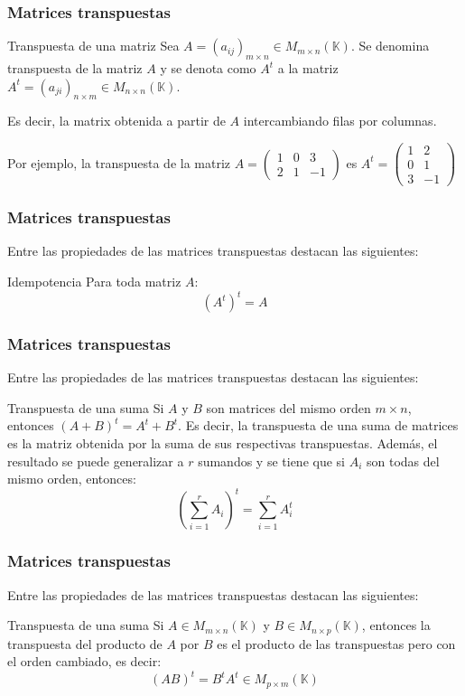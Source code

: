 \documentclass[aspectratio=169]{beamer}
\begin{document}
\begin{frame}
  \frametitle{Matrices transpuestas}
  
   \begin{block}{Transpuesta de una matriz}
Sea $A = (a_{ij})_{m\times n}\in M_{m\times n} (\mathbb{K})$. Se denomina transpuesta de la matriz $A$ y se denota como $A^t$ a la matriz $A^t = (a_{ji})_{n\times m}\in M_{n\times n}(\mathbb{K})$. 

Es decir, la matrix obtenida a partir de $A$ intercambiando filas por columnas. 
\end{block}

Por ejemplo, la transpuesta de la matriz $A =  \left(\begin{array}{ccc}1&0 & 3\\ 2&1 & -1\end{array}\right)$ es $A^t =  \left(\begin{array}{cc}1 & 2\\ 0 & 1\\3 &-1\end{array}\right)$
 \end{frame} 
 
 \begin{frame}
  \frametitle{Matrices transpuestas}
  Entre las propiedades de las matrices transpuestas destacan las siguientes:
   \begin{block}{Idempotencia}
Para toda matriz $A$:
\[(A^t)^t = A\]
\end{block}
 \end{frame} 


 \begin{frame}
  \frametitle{Matrices transpuestas}
   Entre las propiedades de las matrices transpuestas destacan las siguientes:
   \begin{block}{Transpuesta de una suma}
Si $A$ y $B$ son matrices del mismo orden $m\times n$, entonces $(A+B)^t = A^t+B^t$. 
Es decir, la transpuesta de una suma de matrices es la matriz obtenida por la suma de sus respectivas transpuestas. Adem\'as, el resultado se puede generalizar a $r$ sumandos y se tiene que si $A_i$ son todas del mismo orden, entonces:
\[\displaystyle(\sum_{i=1}^r A_i)^t = \sum_{i=1}^r A_i^t\]
\end{block}
 \end{frame} 



 \begin{frame}
  \frametitle{Matrices transpuestas}
  Entre las propiedades de las matrices transpuestas destacan las siguientes:
   \begin{block}{Transpuesta de una suma}
Si $A\in M_{m\times n}(\mathbb{K})$ y $B\in M_{n\times p}(\mathbb{K})$, entonces la transpuesta del producto de $A$ por $B$ es el producto de las transpuestas pero con el orden cambiado, es decir:
\[(AB)^t = B^tA^t\in M_{p\times m}(\mathbb{K})\]
\end{block}
 \end{frame} 
 
\end{document}
